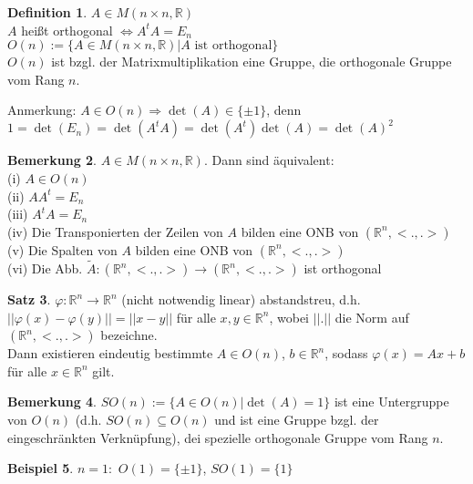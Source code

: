 \documentclass[10pt,a4paper,numbers=endperiod]{scrartcl}
\theoremstyle{definition}
\newtheorem{satz}{Satz}[section]
\newtheorem{defi}[satz]{Definition}
\newtheorem{bem}[satz]{Bemerkung}
\newtheorem{bsp}[satz]{Beispiel}
\def\RR{{\mathbb R}}
\begin{document}
\begin{defi}
	$A \in M(n \times n, \RR)$\\
	$A$ heißt orthogonal $\Leftrightarrow A^tA = E_n$\\
	$O(n) := \{A \in M(n \times n, \RR)| A \text{ ist orthogonal}\}$\\
	$O(n)$ ist bzgl. der Matrixmultiplikation eine Gruppe, die orthogonale Gruppe vom Rang $n$. 
\end{defi}

Anmerkung: $A \in O(n) \Rightarrow \det(A) \in \{\pm 1\}$, denn $1 = \det(E_n) = \det (A^tA) = \det(A^t) \det (A) = \det(A)^2$

\begin{bem}
	$A \in M(n \times n, \RR)$. Dann sind äquivalent:\\
	(i) $A \in O(n)$\\
	(ii) $A A^t = E_n$\\
	(iii) $A^t A = E_n$\\
	(iv) Die Transponierten der Zeilen von $A$ bilden eine ONB von $(\RR^n, <.,.>)$\\
	(v) Die Spalten von $A$ bilden eine ONB von $(\RR^n, <.,.>)$\\
	(vi) Die Abb. $\tilde{A}: (\RR^n, <.,.>) \rightarrow (\RR^n, <.,.>)$ ist orthogonal
\end{bem}

\begin{satz}
	$\varphi: \RR^n \rightarrow \RR^n$ (nicht notwendig linear) abstandstreu, d.h.\\
	$||\varphi(x) - \varphi(y)|| = ||x-y||$ für alle $x,y \in \RR^n$, wobei $||.||$ die Norm auf $(\RR^n, <.,.>)$ bezeichne.\\
	Dann existieren eindeutig bestimmte $A \in O(n)$, $b \in \RR^n$, sodass $\varphi(x) = Ax+b$ für alle $x \in \RR^n$ gilt. 
\end{satz}

\begin{bem}
	$SO(n) := \{A \in O(n)| \det(A) = 1\}$ ist eine Untergruppe von $O(n)$ (d.h. $SO(n) \subseteq O(n)$ und ist eine Gruppe bzgl. der eingeschränkten Verknüpfung), dei spezielle orthogonale Gruppe vom Rang $n$. 
\end{bem}

\begin{bsp}
	$n = 1:$ $O(1) = \{\pm 1\}$, $SO(1) = \{1\}$
\end{bsp}
\end{document}
